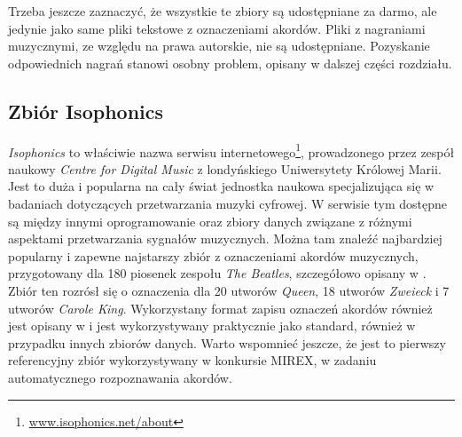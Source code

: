 \begin{table}
    \centering
    \caption{Fragment indeksu zbioru danych po pierwszym etapie jego tworzenia.}
    \label{tab:indeks_01}
\end{table}

Trzeba jeszcze zaznaczyć, że wszystkie te zbiory są udostępniane za darmo, ale jedynie jako same pliki tekstowe z oznaczeniami akordów. Pliki z nagraniami muzycznymi, ze względu na prawa autorskie, nie są udostępniane. Pozyskanie odpowiednich nagrań stanowi osobny problem, opisany w dalszej części rozdziału.

\subsection{Zbiór Isophonics}

\emph{Isophonics} to właściwie nazwa serwisu internetowego\footnote{\url{www.isophonics.net/about}}, prowadzonego przez zespół naukowy \emph{Centre for Digital Music} z londyńskiego Uniwersytety Królowej Marii. Jest to duża i popularna na cały świat jednostka naukowa specjalizująca się w badaniach dotyczących przetwarzania muzyki cyfrowej. W serwisie tym dostępne są między innymi oprogramowanie oraz zbiory danych związane z różnymi aspektami przetwarzania sygnałów muzycznych.  Można tam znaleźć najbardziej popularny i zapewne najstarszy zbiór z oznaczeniami akordów muzycznych, przygotowany dla 180 piosenek zespołu \emph{The Beatles}, szczegółowo opisany w \cite{harte_towards_nodate}. Zbiór ten rozrósł się o oznaczenia dla 20 utworów \emph{Queen}, 18 utworów \emph{Zweieck} i 7 utworów \emph{Carole King}. Wykorzystany format zapisu oznaczeń akordów również jest opisany w \cite{harte_towards_nodate} i jest wykorzystywany praktycznie jako standard, również w przypadku innych zbiorów danych. Warto wspomnieć jeszcze, że jest to pierwszy referencyjny zbiór wykorzystywany w konkursie MIREX, w zadaniu automatycznego rozpoznawania akordów.

